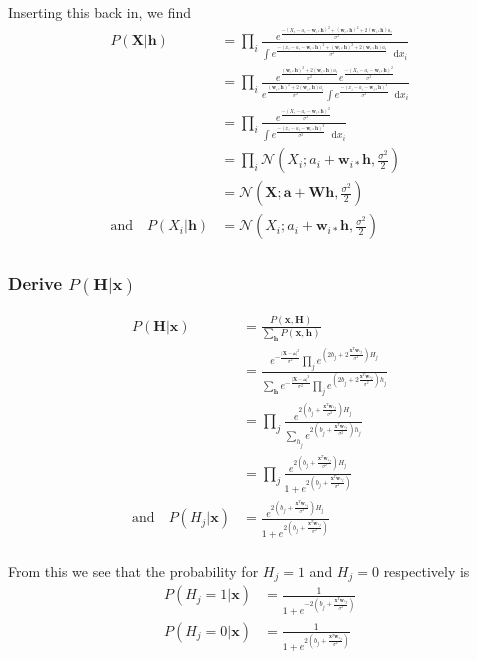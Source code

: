 \documentclass[norsk,a4paper,11pt]{article}
\newcommand*\diff{\mathop{}\!\mathrm{d}}
\newcommand{\VX}{\mathbf{X}}
\newcommand{\Vx}{\mathbf{x}}
\newcommand{\VH}{\mathbf{H}}
\newcommand{\Vh}{\mathbf{h}}
\newcommand{\VW}{\mathbf{W}}
\newcommand{\Vwi}{\mathbf{w}_{i*}}
\newcommand{\Vwj}{\mathbf{w}_{*j}}
\newcommand{\Va}{\mathbf{a}}
\begin{document}
Inserting this back in, we find
\begin{align}
	P(\VX | \Vh) &= \prod_i \frac{e^{\frac{-(X_i - a_i- \Vwi \Vh)^2 + (\Vwi  \Vh)^2 + 2(\Vwi \Vh)a_i}{\sigma^2}}}{\int e^{\frac{-(x_i - a_i- \Vwi \Vh)^2 + (\Vwi  \Vh)^2 + 2(\Vwi \Vh)a_i}{\sigma^2}} \diff x_i } \\
	&= \prod_i \frac{e^{\frac{(\Vwi  \Vh)^2 + 2(\Vwi \Vh)a_i}{\sigma^2}}e^{\frac{-(X_i - a_i- \Vwi \Vh)^2}{\sigma^2}}}{e^{\frac{(\Vwi  \Vh)^2 + 2(\Vwi \Vh)a_i}{\sigma^2}}\int e^{\frac{-(x_i - a_i- \Vwi \Vh)^2}{\sigma^2}} \diff x_i } \\
	&= \prod_i \frac{e^{\frac{-(X_i - a_i- \Vwi \Vh)^2}{\sigma^2}}}{\int e^{\frac{-(x_i - a_i- \Vwi \Vh)^2}{\sigma^2}} \diff x_i } \\
	&= \prod_i \mathcal{N} (X_i ;  a_i + \Vwi \Vh,  \frac{\sigma^2}{2}) \\
	&= \mathcal{N} (\VX ; \Va + \VW \Vh, \frac{\sigma^2}{2}) \\
	\text{and} \quad P(X_i | \Vh) &= \mathcal{N} (X_i ;  a_i + \Vwi \Vh,  \frac{\sigma^2}{2}) \\
\end{align}

\subsubsection{Derive $P(\VH | \Vx)$}

\begin{align}
	P(\VH | \Vx) &= \frac{P(\Vx, \VH)}{\sum_\Vh P(\Vx, \Vh)} \\
	&= \frac{e^{-\frac{|\VX - \Va|^2}{\sigma^2} } \prod_j e^{(2b_j + 2\frac{\Vx^T \Vwj}{\sigma^2})H_j} }{\sum_\Vh e^{-\frac{|\VX - \Va|^2}{\sigma^2}} \prod_j e^{(2b_j + 2\frac{\Vx^T \Vwj}{\sigma^2}) h_j} } \\
	&= \prod_j \frac{e^{2(b_j + \frac{\Vx^T \Vwj}{\sigma^2})H_j} }{\sum_{h_j} e^{2(b_j + \frac{\Vx^T \Vwj}{\sigma^2})h_j} } \\
	&= \prod_j \frac{e^{2(b_j + \frac{\Vx^T \Vwj}{\sigma^2})H_j} }{1 + e^{2(b_j + \frac{\Vx^T \Vwj}{\sigma^2})} } \\
	\text{and} \quad P(H_j | \Vx) &= \frac{e^{2(b_j + \frac{\Vx^T \Vwj}{\sigma^2})H_j} }{1 + e^{2(b_j + \frac{\Vx^T \Vwj}{\sigma^2})} } \\
\end{align}

From this we see that the probability for $H_j=1$ and $H_j=0$ respectively is
\begin{align}
	P(H_j=1 | \Vx) &= \frac{1}{1 + e^{-2(b_j + \frac{\Vx^T \Vwj}{\sigma^2})} } \\
	P(H_j=0 | \Vx) &= \frac{1}{1 + e^{2(b_j + \frac{\Vx^T \Vwj}{\sigma^2})} }
\end{align}
\end{document}
